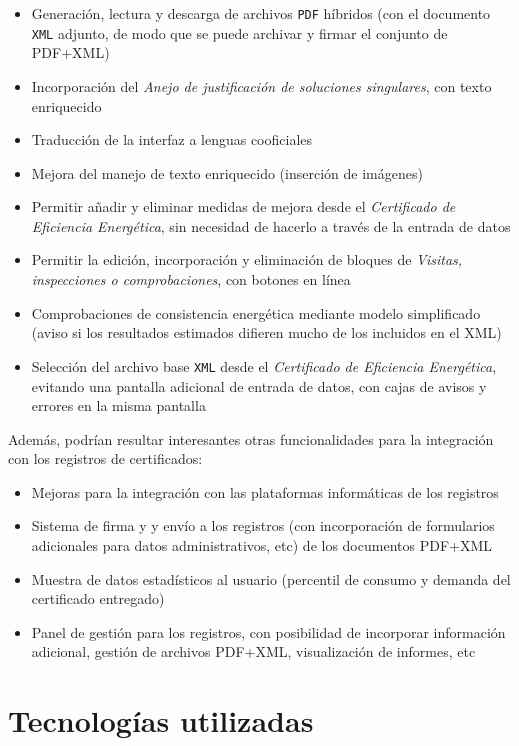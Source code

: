 \documentclass[10pt,notitlepage,oneside,a4paper]{article}
\begin{document}
\begin{itemize}
\item Generación, lectura y descarga de archivos \texttt{PDF} híbridos (con el documento \texttt{XML} adjunto, de modo que se puede archivar y firmar el conjunto de PDF+XML)
\item Incorporación del \textit{Anejo de justificación de soluciones singulares}, con texto enriquecido
\item Traducción de la interfaz a lenguas cooficiales
\item Mejora del manejo de texto enriquecido (inserción de imágenes)
\item Permitir añadir y eliminar medidas de mejora desde el \textit{Certificado de Eficiencia Energética}, sin necesidad de hacerlo a través de la entrada de datos
\item Permitir la edición, incorporación y eliminación de bloques de \textit{Visitas, inspecciones o comprobaciones}, con botones en línea
\item Comprobaciones de consistencia energética mediante modelo simplificado (aviso si los resultados estimados difieren mucho de los incluidos en el XML)
\item Selección del archivo base \texttt{XML} desde el \textit{Certificado de Eficiencia Energética}, evitando una pantalla adicional de entrada de datos, con cajas de avisos y errores en la misma pantalla
\end{itemize}

Además, podrían resultar interesantes otras funcionalidades para la integración con los registros de certificados:
 
\begin{itemize}
\item Mejoras para la integración con las plataformas informáticas de los registros
\item Sistema de firma y y envío a los registros (con incorporación de formularios adicionales para datos administrativos, etc) de los documentos PDF+XML
\item Muestra de datos estadísticos al usuario (percentil de consumo y demanda del certificado entregado)
\item Panel de gestión para los registros, con posibilidad de incorporar información adicional, gestión de archivos PDF+XML, visualización de informes, etc
\end{itemize}

\section{Tecnologías utilizadas}
\end{document}
